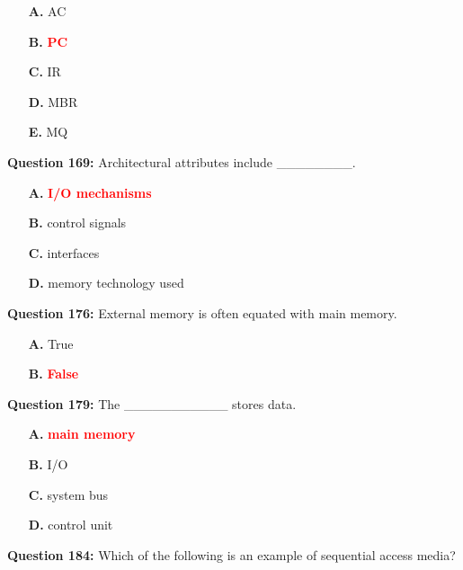 \documentclass[12pt,a4paper]{article}
\begin{document}
\begin{itemize}
    \item[\textbf{A.}] AC
    \item[\textbf{B.}] \textcolor{red}{\textbf{PC}}
    \item[\textbf{C.}] IR
    \item[\textbf{D.}] MBR
    \item[\textbf{E.}] MQ
\end{itemize}

\vspace{0.5cm}

\textbf{Question 169:} Architectural attributes include ________.

\begin{itemize}
    \item[\textbf{A.}] \textcolor{red}{\textbf{I/O mechanisms}}
    \item[\textbf{B.}] control signals
    \item[\textbf{C.}] interfaces
    \item[\textbf{D.}] memory technology used
\end{itemize}

\vspace{0.5cm}

\textbf{Question 176:} External memory is often equated with main memory.

\begin{itemize}
    \item[\textbf{A.}] True
    \item[\textbf{B.}] \textcolor{red}{\textbf{False}}
\end{itemize}

\vspace{0.5cm}

\textbf{Question 179:} The ___________ stores data.

\begin{itemize}
    \item[\textbf{A.}] \textcolor{red}{\textbf{main memory}}
    \item[\textbf{B.}] I/O
    \item[\textbf{C.}] system bus
    \item[\textbf{D.}] control unit
\end{itemize}

\vspace{0.5cm}

\textbf{Question 184:} Which of the following is an example of sequential access media?
\end{document}
